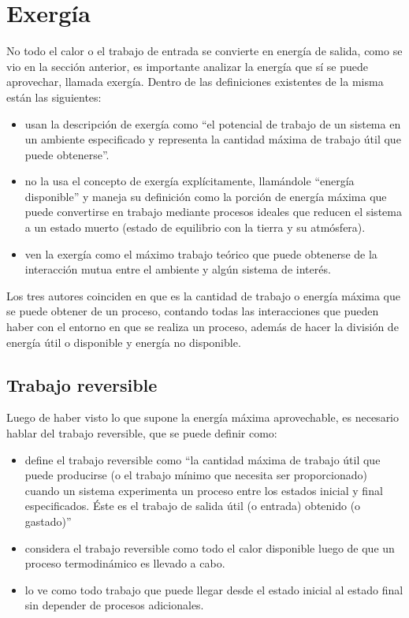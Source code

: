 \section{Exergía}

No todo el calor o el trabajo de entrada se convierte en energía de salida, como se vio en la sección anterior, es importante analizar la energía que sí se puede aprovechar, llamada exergía. Dentro de las definiciones existentes de la misma están las siguientes:

\begin{itemize}
  \item \textcite{ccengel2006termodinamica} usan la descripción de exergía como ``el potencial de trabajo de un sistema en un ambiente especificado y representa la cantidad máxima de trabajo útil que puede obtenerse''.
  \item \textcite{rajput2009engineering} no la usa el concepto de exergía explícitamente, llamándole ``energía disponible'' y maneja su definición como la porción de energía máxima que puede convertirse en trabajo mediante procesos ideales que reducen el sistema a un estado muerto (estado de equilibrio con la tierra y su atmósfera).
  \item \textcite{shapirotermo} ven la exergía como el máximo trabajo teórico que puede obtenerse de la interacción mutua entre el ambiente y algún sistema de interés.
\end{itemize}

Los tres autores coinciden en que es la cantidad de trabajo o energía máxima que se puede obtener de un proceso, contando todas las interacciones que pueden haber con el entorno en que se realiza un proceso, además de hacer la división de energía útil o disponible y energía no disponible.

\subsection{Trabajo reversible} %
\label{sub:Trabajo reversible}


Luego de haber visto lo que supone la energía máxima aprovechable, es necesario hablar del trabajo reversible, que se puede definir como:

\begin{itemize}
  \item \textcite{ccengel2006termodinamica} define el trabajo reversible como ``la cantidad máxima de trabajo útil que puede producirse (o el trabajo mínimo que necesita ser proporcionado) cuando un sistema experimenta un proceso entre los estados inicial y final especificados. Éste es el trabajo de salida útil (o entrada) obtenido (o gastado)''
  \item \textcite{burghardt1984ingenieria} considera el trabajo reversible como todo el calor disponible luego de que un proceso termodinámico es llevado a cabo.
  \item \textcite{shapirotermo} lo ve como todo trabajo que puede llegar desde el estado inicial al estado final sin depender de procesos adicionales.
\end{itemize}



